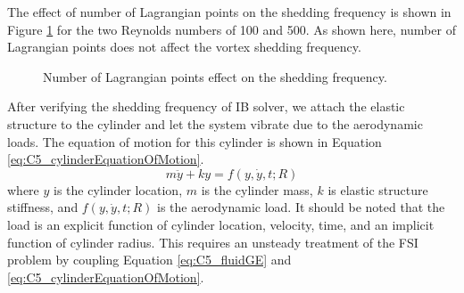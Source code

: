 %
The effect of number of Lagrangian points on the shedding frequency is shown in Figure \ref{fig:C5_numberOfLagrangianOnSheddingFreq} for the two Reynolds numbers of 100 and 500. As shown here, number of Lagrangian points does not affect the vortex shedding frequency.
%
\begin{figure}[H]
    \centering
    \quad
    \caption{Number of Lagrangian points effect on the shedding frequency.}
    \label{fig:C5_numberOfLagrangianOnSheddingFreq}
\end{figure}
%
After verifying the shedding frequency of IB solver, we attach the elastic structure to the cylinder and let the system vibrate due to the aerodynamic loads. The equation of motion for this cylinder is shown in Equation \eqref{eq:C5_cylinderEquationOfMotion}.
%
\begin{equation}\label{eq:C5_cylinderEquationOfMotion}
	m \ddot{y} + k y = f(y, \dot{y}, t; R)
\end{equation}
%
where $y$ is the cylinder location, $m$ is the cylinder mass, $k$ is elastic structure stiffness, and $f(y, \dot{y}, t; R)$ is the aerodynamic load. It should be noted that the load is an explicit function of cylinder location, velocity, time, and an implicit function of cylinder radius. This requires an unsteady treatment of the FSI problem by coupling Equation \eqref{eq:C5_fluidGE} and \eqref{eq:C5_cylinderEquationOfMotion}.

